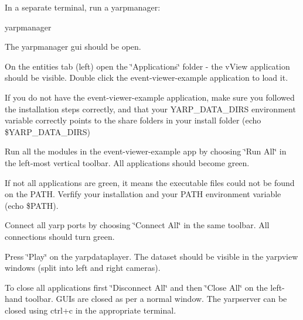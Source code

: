 \begin{DoxyItemize}
\item In a separate terminal, run a yarpmanager\+: 
\begin{DoxyCode}
yarpmanager
\end{DoxyCode}

\item The yarpmanager gui should be open.
\item On the entities tab (left) open the \char`\"{}\+Applications\char`\"{} folder -\/ the v\+View application should be visible. Double click the {\ttfamily event-\/viewer-\/example} application to load it.
\item If you do not have the {\ttfamily event-\/viewer-\/example} application, make sure you followed the installation steps correctly, and that your {\ttfamily Y\+A\+R\+P\+\_\+\+D\+A\+T\+A\+\_\+\+D\+I\+RS} environment variable correctly points to the share folders in your install folder ({\ttfamily echo \$\+Y\+A\+R\+P\+\_\+\+D\+A\+T\+A\+\_\+\+D\+I\+RS})
\item Run all the modules in the {\ttfamily event-\/viewer-\/example} app by choosing \char`\"{}\+Run All\char`\"{} in the left-\/most vertical toolbar. All applications should become green.
\item If not all applications are green, it means the executable files could not be found on the {\ttfamily P\+A\+TH}. Verfify your installation and your {\ttfamily P\+A\+TH} environment variable ({\ttfamily echo \$\+P\+A\+TH}).
\item Connect all yarp ports by choosing \char`\"{}\+Connect All\char`\"{} in the same toolbar. All connections should turn green.
\item Press \char`\"{}\+Play\char`\"{} on the yarpdataplayer. The dataset should be visible in the yarpview windows (split into left and right cameras).
\item To close all applications first \char`\"{}\+Disconnect All\char`\"{} and then \char`\"{}\+Close All\char`\"{} on the left-\/hand toolbar. G\+UI\textquotesingle{}s are closed as per a normal window. The yarpserver can be closed using {\ttfamily ctrl+c} in the appropriate terminal. 
\end{DoxyItemize}